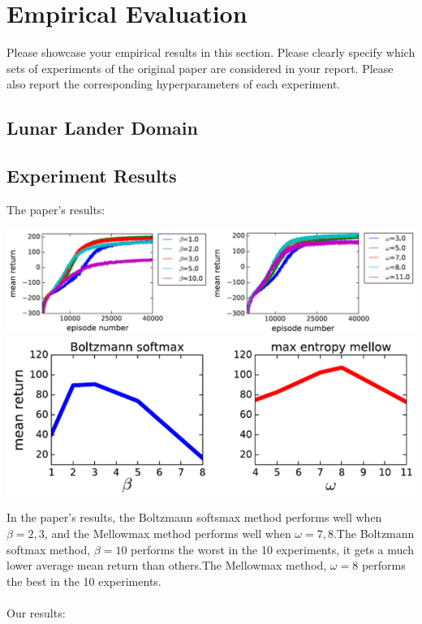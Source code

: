 \section{Empirical Evaluation}
\label{section:evaluation}
Please showcase your empirical results in this section. Please clearly specify which sets of experiments of the original paper are considered in your report. Please also report the corresponding hyperparameters of each experiment.
\subsection{Lunar Lander Domain}
\subsection*{Experiment Results}
The paper's results:\\
\begin{center}
    \includegraphics[scale=0.7]{lunar_paper1.png}\\
    \includegraphics[scale=0.7]{lunar_paper2.png}
\end{center}
In the paper's results, the Boltzmann softsmax method performs well when $\beta=2, 3$, and the Mellowmax method 
performs well when $\omega=7, 8$.The Boltzmann softmax method, $\beta=10$ performs the worst in the 10 experiments, it 
gets a much lower average mean return than others.The Mellowmax method, $\omega=8$ performs the best in the 10 experiments.\\\\
Our results:\\
